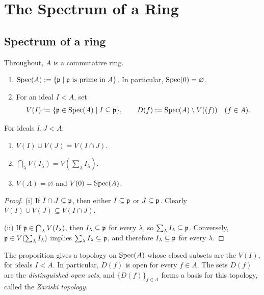 \documentclass[11pt,a4paper]{article}
\begin{document}
\section*{The Spectrum of a Ring}
\subsection{Spectrum of a ring}
Throughout, $A$ is a commutative ring.
\setcounter{definition}{16}\begin{definition}
\begin{enumerate}[label=(\roman*)]
\setcounter{enumi}{0}\item $\operatorname{Spec}(A):=\{\mathfrak p\mid\mathfrak p\text{ is prime in }A\}$. In particular, $\operatorname{Spec}(0)=\varnothing$.
\setcounter{enumi}{1}\item For an ideal $I<A$, set
\[V(I):=\{\mathfrak p\in\operatorname{Spec}(A)\mid I\subseteq\mathfrak p\},\qquad D(f):=\operatorname{Spec}(A)\setminus V((f))\quad(f\in A).\]
\end{enumerate}
\end{definition}
\setcounter{theorem}{29}\begin{proposition}
For ideals $I,J<A$:
\begin{enumerate}[label=(\roman*)]
\setcounter{enumi}{0}\item $V(I)\cup V(J)=V(I\cap J)$.
\setcounter{enumi}{1}\item $\bigcap_{\lambda}V(I_{\lambda})=V(\sum_{\lambda}I_{\lambda})$.
\setcounter{enumi}{2}\item $V(A)=\varnothing$ and $V(0)=\operatorname{Spec}(A)$.
\end{enumerate}
\end{proposition}
\begin{proof}
(i) If $I\cap J\subseteq\mathfrak p$, then either $I\subseteq\mathfrak p$ or $J\subseteq\mathfrak p$. Clearly $V(I)\cup V(J)\subseteq V(I\cap J)$.

(ii) If $\mathfrak p\in\bigcap_{\lambda}V(I_{\lambda})$, then $I_{\lambda}\subseteq\mathfrak p$ for every $\lambda$, so $\sum_{\lambda}I_{\lambda}\subseteq\mathfrak p$. Conversely, $\mathfrak p\in V(\sum_{\lambda}I_{\lambda})$ implies $\sum_{\lambda}I_{\lambda}\subseteq\mathfrak p$, and therefore $I_{\lambda}\subseteq\mathfrak p$ for every $\lambda$.
\end{proof}
The proposition gives a topology on $\operatorname{Spec}(A)$ whose closed subsets are the $V(I)$, for ideals $I<A$. In particular, $D(f)$ is open for every $f\in A$. The sets $D(f)$ are the \emph{distinguished open sets}, and $\{D(f)\}_{f\in A}$ forms a basis for this topology, called the \emph{Zariski topology}.
\end{document}
